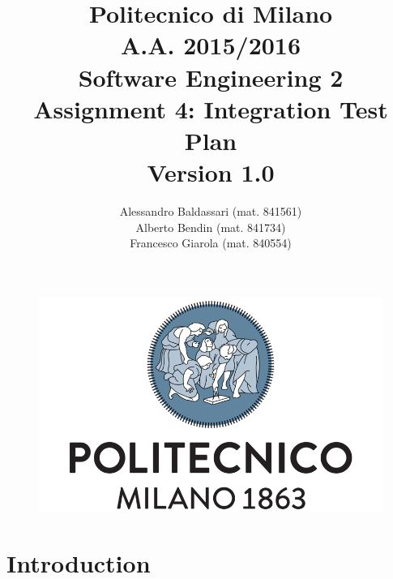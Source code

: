 \documentclass[a4paper,11pt]{report} %
\title{Politecnico di Milano\\A.A. 2015/2016\\Software Engineering 2\\ \bigskip 
Assignment 4: Integration Test Plan\\
{\normalsize Version 1.0}}
\author{Alessandro Baldassari (mat. 841561) \\ Alberto Bendin (mat. 841734) \\ Francesco Giarola (mat. 840554)}
\begin{document}
	
	
	\begin{figure}[t]
		\centering
		\includegraphics[width=1\linewidth]{"Pictures/polimi-logo"}
		\label{fig:polimi-logo}
	\end{figure}
	
	\maketitle
		
	
	\thispagestyle{empty}
	\clearpage\mbox{}\clearpage

	
	
	
	\renewcommand*\thesection{\arabic{section}}
	\renewcommand*\thesubsection{\arabic{section}.\arabic{subsection}}
	\renewcommand*\thesubsubsection{%
	\arabic{section}.\arabic{subsection}.\arabic{subsubsection}%
	}
	\setcounter{secnumdepth}{4}
	\setcounter{tocdepth}{4}
	

	
	\tableofcontents
	\newpage
	
	
	
	\section{Introduction} 
\end{document}
